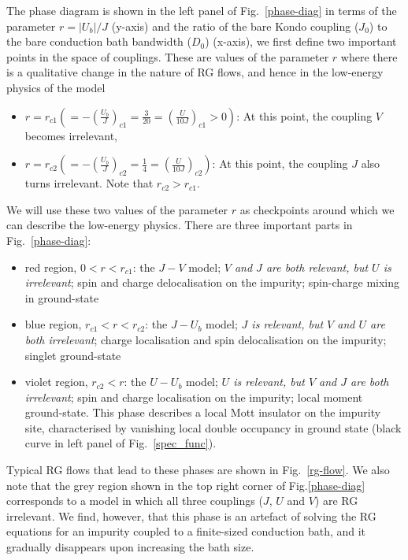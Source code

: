 The phase diagram is shown in the left panel of Fig.~\eqref{phase-diag} in terms of the parameter $r=|U_{b}|/J$ (y-axis) and the ratio of the bare Kondo coupling ($J_{0}$) to the bare conduction bath bandwidth ($D_{0}$) (x-axis), we first define two important points in the space of couplings. These are values of the parameter \(r\) where there is a qualitative change in the nature of RG flows, and hence in the low-energy physics of the model
\begin{itemize}
	\item \(r = r_{c1} \left(= -\left(\frac{U_b}{J}\right)_{c1} = \frac{3}{20} = \left(\frac{U}{10 J}\right)_{c1}>0\right)\): At this point, the coupling \(V\) becomes irrelevant,
	\item \(r = r_{c2} \left(= -\left(\frac{U_b}{J}\right)_{c2} = \frac{1}{4} = \left(\frac{U}{10 J}\right)_{c2}\right)\): At this point, the coupling \(J\) also turns irrelevant. Note that $r_{c2} > r_{c1}$.
\end{itemize}
We will use these two values of the parameter $r$ as checkpoints around which we can describe the low-energy physics. 
There are three important parts in Fig.~\eqref{phase-diag}:
\begin{itemize}
	\item red region, \(0 < r < r_{c1}\): the \(J-V\) model; {\it \(V\) and \(J\) are both relevant, but $U$ is irrelevant}; spin and charge delocalisation on the impurity; spin-charge mixing in ground-state
	\item blue region, \(r_{c1} < r < r_{c2}\): the \(J-U_b\) model; {\it $J$ is relevant, but \(V\) and $U$ are both irrelevant}; charge localisation and spin delocalisation on the impurity; singlet ground-state
	\item violet region, \(r_{c2} < r\): the \(U-U_b\) model; {\it $U$ is relevant, but \(V\) and \(J\) are both irrelevant}; spin and charge localisation on the impurity; local moment ground-state. This phase describes a local Mott insulator on the impurity site, characterised by vanishing local double occupancy in ground state (black curve in left panel of Fig.~\ref{spec_func}).
\end{itemize}
Typical RG flows that lead to these phases are shown in Fig.~\eqref{rg-flow}. We also note that the grey region shown in the top right corner of Fig.\eqref{phase-diag} corresponds to a model in which all three couplings ($J$, $U$ and $V$) are RG irrelevant. We find, however, that this phase is an artefact of solving the RG equations for an impurity coupled to a finite-sized conduction bath, and it gradually disappears upon increasing the bath size.

